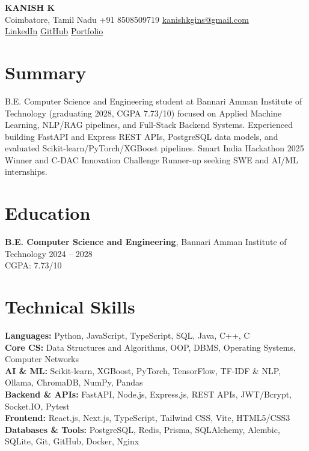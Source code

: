 \documentclass[10pt,a4paper]{article}
\begin{document}
\begin{center}
  {\LARGE \textbf{KANISH K}}\\[3pt]
  \small Coimbatore, Tamil Nadu \textemdash{} +91 8508509719 \textemdash{} \href{mailto:kanishkgins@gmail.com}{kanishkgins@gmail.com}\\
  \href{https://linkedin.com/in/kanish-k850}{LinkedIn} \textemdash{} \href{https://github.com/KANISH-850}{GitHub} \textemdash{} \href{https://KANISH-850.github.io/Kanish_K_Portfolio/}{Portfolio}
\end{center}

\section*{Summary}
B.E. Computer Science and Engineering student at Bannari Amman Institute of Technology (graduating 2028, CGPA 7.73/10) focused on Applied Machine Learning, NLP/RAG pipelines, and Full-Stack Backend Systems. Experienced building FastAPI and Express REST APIs, PostgreSQL data models, and evaluated Scikit-learn/PyTorch/XGBoost pipelines. Smart India Hackathon 2025 Winner and C-DAC Innovation Challenge Runner-up seeking SWE and AI/ML internships.

\section*{Education}
\textbf{B.E. Computer Science and Engineering}, Bannari Amman Institute of Technology \hfill 2024 -- 2028\\
CGPA: 7.73/10

\section*{Technical Skills}
\textbf{Languages:} Python, JavaScript, TypeScript, SQL, Java, C++, C\\
\textbf{Core CS:} Data Structures and Algorithms, OOP, DBMS, Operating Systems, Computer Networks\\
\textbf{AI \& ML:} Scikit-learn, XGBoost, PyTorch, TensorFlow, TF-IDF \& NLP, Ollama, ChromaDB, NumPy, Pandas\\
\textbf{Backend \& APIs:} FastAPI, Node.js, Express.js, REST APIs, JWT/Bcrypt, Socket.IO, Pytest\\
\textbf{Frontend:} React.js, Next.js, TypeScript, Tailwind CSS, Vite, HTML5/CSS3\\
\textbf{Databases \& Tools:} PostgreSQL, Redis, Prisma, SQLAlchemy, Alembic, SQLite, Git, GitHub, Docker, Nginx
\end{document}
